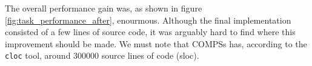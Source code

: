 The overall performance gain was, as shown in figure \ref{fig:task_performance_after}, enourmous. Although the final implementation consisted of a few lines of source code, it was arguably hard to find where this improvement should be made. We must note that COMPSs has, according to the \verb|cloc| tool, around 300000 source lines of code (sloc).
